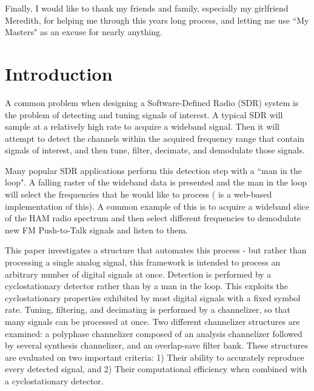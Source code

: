 \documentclass[12pt]{report}
\begin{document}
Finally, I would like to thank my friends and family, especially my girlfriend
Meredith, for helping me through this years long process, and letting me use
``My Masters" as an excuse for nearly anything.

\tableofcontents
\pagebreak

\listoffigures
\pagebreak


\pagestyle{myheadings}

\chapter{Introduction}
\label{sec:intro}

A common problem when designing a Software-Defined Radio (SDR) system is the
problem of detecting and tuning signals of interest. A typical SDR will sample
at a relatively high rate to acquire a wideband signal. Then it will attempt to
detect the channels within the acquired frequency range that contain signals of
interest, and then tune, filter, decimate, and demodulate those signals. 

Many popular SDR applications perform this detection step with a ``man in the
loop".  A falling raster of the wideband data is presented and the man in the
loop will select  the frequencies that he would like to process (\cite{WebSDR}
is a web-based implementation of this).  A common example of this is to acquire
a wideband slice of the HAM radio spectrum and then select different
frequencies to demodulate new FM Push-to-Talk signals and listen to them.

This paper investigates a structure that automates this process - but rather
than processing a single analog signal, this framework is intended to process
an arbitrary number of digital signals at once. Detection is performed by
a cyclostationary detector rather than by a man in the loop. This exploits the
cyclostationary properties exhibited by most digital signals with a fixed
symbol rate.  Tuning, filtering, and decimating is performed by a channelizer,
so that many signals can be processed at once.  Two different channelizer
structures are examined: a polyphase channelizer composed of an analysis
channelizer followed by several synthesis channelizer, and an overlap-save
filter bank. These structures are evaluated on two important criteria:
1) Their ability to accurately reproduce every detected signal, and 2) Their
computational efficiency when combined with a cyclostationary detector.
\end{document}
